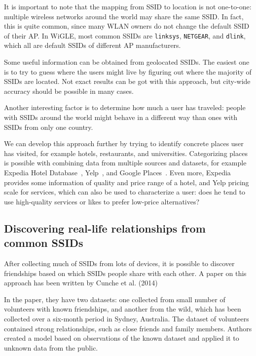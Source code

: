 \documentclass[12pt,a4paper,oneside,pdftex]{report}
\begin{document}
It is important to note that the mapping from SSID to location is not one-to-one: multiple wireless networks around the world may share the same SSID. In fact, this is quite common, since many WLAN owners do not change the default SSID of their AP. In WiGLE, most common SSIDs are \texttt{linksys}, \texttt{NETGEAR}, and \texttt{dlink}, which all are default SSIDs of different AP manufacturers.

Some useful information can be obtained from geolocated SSIDs. The easiest one is to try to guess where the users might live by figuring out where the majority of SSIDs are located. Not exact results can be got with this approach, but city-wide accuracy should be possible in many cases.

Another interesting factor is to determine how much a user has traveled: people with SSIDs around the world might behave in a different way than ones with SSIDs from only one country. 

We can develop this approach further by trying to identify concrete places user has visited, for example hotels, restaurants, and universities. Categorizing places is possible with combining data from multiple sources and datasets, for example Expedia Hotel Database~\cite{expedia_hotel_db}, Yelp~\cite{yelp}, and Google Places~\cite{google_places}. Even more, Expedia provides some information of quality and price range of a hotel, and Yelp pricing scale for services, which can also be used to characterize a user: does he tend to use high-quality services or likes to prefer low-price alternatives?

\subsection{Discovering real-life relationships from common SSIDs}
\label{subsec:ssid_commons}

After collecting much of SSIDs from lots of devices, it is possible to discover friendships based on which SSIDs people share with each other. A paper on this approach has been written by Cunche et al. (2014)~\cite{cunche2014linking}

In the paper, they have two datasets: one collected from small number of volunteers with known friendships, and another from the wild, which has been collected over a six-month period in Sydney, Australia. The dataset of volunteers contained strong relationships, such as close friends and family members. Authors created a model based on observations of the known dataset and applied it to unknown data from the public.
\end{document}
